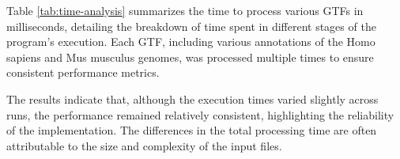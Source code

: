 \documentclass{article}
\begin{document}
    \begin{table}[H]
        \caption{Time Taken for each Dataset in ms}
        \label{tab:time-analysis}
    \end{table}


    Table \ref{tab:time-analysis} summarizes the time to process various GTFs in milliseconds, detailing the breakdown of time spent in different stages of the program's execution. Each GTF, including various annotations of the Homo sapiens and Mus musculus genomes, was processed multiple times to ensure consistent performance metrics.

    The results indicate that, although the execution times varied slightly across runs, the performance remained relatively consistent, highlighting the reliability of the implementation. The differences in the total processing time are often attributable to the size and complexity of the input files.
\end{document}
